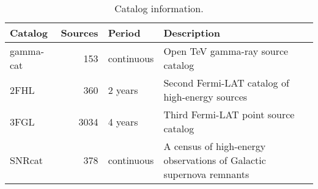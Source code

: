 \begin{table}[tb]

\caption{Catalog information.}
\label{tab:catalogs}
\begin{tabular}{ lrll }
\hline


Catalog & Sources & Period & Description \\ \hline
gamma-cat & 153 & continuous & Open TeV gamma-ray source catalog\\
2FHL & 360 & 2 years & Second Fermi-LAT catalog of high-energy sources\\
3FGL & 3034 & 4 years & Third Fermi-LAT point source catalog\\
SNRcat & 378 & continuous & A census of high-energy observations of Galactic supernova remnants\\
\hline
\end{tabular}
\end{table}
